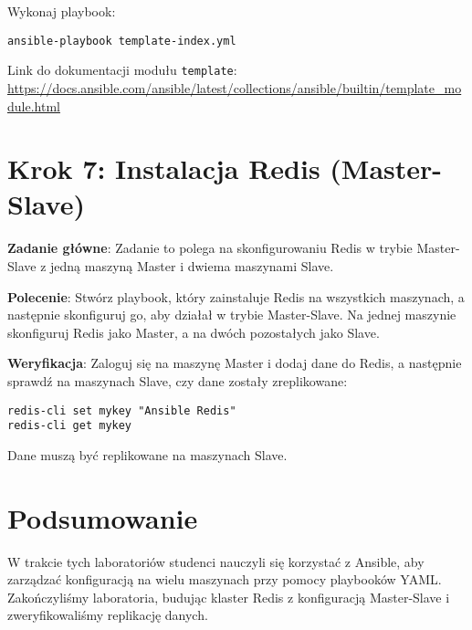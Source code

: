 \documentclass{article}
\begin{document}
Wykonaj playbook:

\begin{lstlisting}
ansible-playbook template-index.yml
\end{lstlisting}

Link do dokumentacji modułu \texttt{template}:  
\url{https://docs.ansible.com/ansible/latest/collections/ansible/builtin/template_module.html}

\section{Krok 7: Instalacja Redis (Master-Slave)}

\textbf{Zadanie główne}:  
Zadanie to polega na skonfigurowaniu Redis w trybie Master-Slave z jedną maszyną Master i dwiema maszynami Slave.

\textbf{Polecenie}:  
Stwórz playbook, który zainstaluje Redis na wszystkich maszynach, a następnie skonfiguruj go, aby działał w trybie Master-Slave. Na jednej maszynie skonfiguruj Redis jako Master, a na dwóch pozostałych jako Slave.

\textbf{Weryfikacja}:  
Zaloguj się na maszynę Master i dodaj dane do Redis, a następnie sprawdź na maszynach Slave, czy dane zostały zreplikowane:

\begin{lstlisting}
redis-cli set mykey "Ansible Redis"
redis-cli get mykey
\end{lstlisting}

Dane muszą być replikowane na maszynach Slave.

\section*{Podsumowanie}
W trakcie tych laboratoriów studenci nauczyli się korzystać z Ansible, aby zarządzać konfiguracją na wielu maszynach przy pomocy playbooków YAML. Zakończyliśmy laboratoria, budując klaster Redis z konfiguracją Master-Slave i zweryfikowaliśmy replikację danych.
\end{document}

